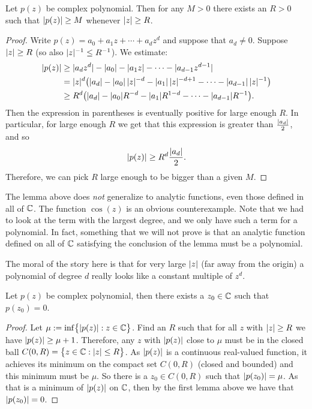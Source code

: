 \begin{lemma}
Let $p(z)$ be complex polynomial.  Then for any $M > 0$ there exists
an $R > 0$ such that
$\lvert {p(z)} \rvert \geq M$ whenever $\lvert {z} \rvert \geq R$.
\end{lemma}

\begin{proof}
Write $p(z) = a_0 + a_1 z + \cdots + a_d z^d$ and suppose that
$a_d \not= 0$.
Suppose $\lvert {z} \rvert \geq R$ (so also $\lvert {z} \rvert^{-1} \leq R^{-1}$).
We estimate:
\begin{equation*}
\begin{split}
\lvert {p(z)} \rvert
& \geq
\lvert {a_d z^d} \rvert -
\lvert {a_0} \rvert - \lvert {a_1 z} \rvert - \cdots - \lvert {a_{d-1} z^{d-1} } \rvert
\\
& =
\lvert {z} \rvert^d \bigl(
\lvert {a_d} \rvert -
\lvert {a_0} \rvert \, \lvert {z} \rvert^{-d} -
\lvert {a_1} \rvert \, \lvert {z} \rvert^{-d+1} - \cdots - \lvert {a_{d-1}} \rvert \, \lvert {z} \rvert^{-1}
\bigr)
\\
& \geq
R^d \bigl(\lvert {a_d} \rvert -
\lvert {a_0} \rvert R^{-d} - \lvert {a_1} \rvert R^{1-d} - \cdots - \lvert {a_{d-1}} \rvert R^{-1} \bigr)
.
\end{split}
\end{equation*}
Then the expression in parentheses is eventually positive for large enough
$R$.  In particular, for large enough $R$ we get that this expression
is greater than
$\frac{\lvert {a_d} \rvert}{2}$, and so
\begin{equation*}
\lvert {p(z)} \rvert
\geq
R^d \frac{\lvert {a_d} \rvert}{2} .
\end{equation*}
Therefore,
we can pick $R$ large enough to be bigger than a given $M$.
\end{proof}

The lemma above does \emph{not} generalize to analytic
functions, even those defined in all of ${\mathbb{C}}$.  The function
$\cos(z)$ is an obvious counterexample.
Note that we had to look
at the term with the largest degree, and we only have such a term for
a polynomial.  In fact, something that we will not prove is that
an analytic function defined on all of ${\mathbb{C}}$ satisfying the conclusion
of the lemma must be a polynomial.

The moral of the story here is that for very large $\lvert {z} \rvert$ (far away from
the origin) a polynomial of degree $d$ really looks like a constant multiple
of $z^d$.

\begin{thm}
Let $p(z)$ be complex polynomial, then there exists a $z_0 \in {\mathbb{C}}$
such that $p(z_0) = 0$.
\end{thm}

\begin{proof}
Let $\mu := \inf \bigl\{ \lvert {p(z)} \rvert : z \in {\mathbb{C}} \bigr\}$.  Find an $R$ such that
for all $z$ with $\lvert {z} \rvert \geq R$ we have $\lvert {p(z)} \rvert \geq \mu+1$.
Therefore, any $z$ with $\lvert {p(z)} \rvert$ close to $\mu$ must be in the
closed ball $C(0,R) = \bigl\{ z \in {\mathbb{C}} : \lvert {z} \rvert \leq R \bigr\}$.  As $\lvert {p(z)} \rvert$
is a continuous real-valued function, it achieves its minimum
on the compact set $C(0,R)$ (closed and bounded) and this minimum must
be $\mu$.  So there is a $z_0 \in C(0,R)$ such that $\lvert {p(z_0)} \rvert = \mu$.
As that is a minimum of $\lvert {p(z)} \rvert$ on ${\mathbb{C}}$, then by the first lemma above we have
that $\lvert {p(z_0)} \rvert = 0$.
\end{proof}


